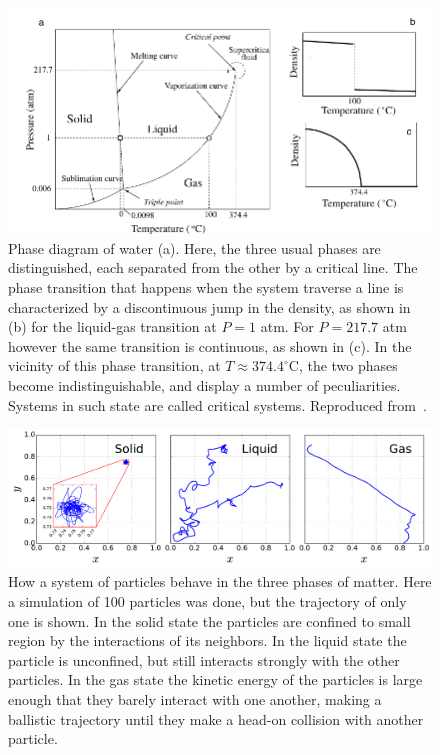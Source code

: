 \begin{figure}[h]
\begin{center}
    \includegraphics[scale=1.0]{chapters/ch2-crit/figs/water}
\end{center}
\caption{Phase diagram of water (a). Here, the three usual phases are
    distinguished, each separated from the other by a critical line. The phase
    transition that happens when the system traverse a line is characterized by
    a discontinuous jump in the density, as shown in (b) for the liquid-gas
    transition at $P=1$ atm. For $P=217.7$ atm however the same transition is
    continuous, as shown in (c). In the vicinity of this phase transition, at
    $T\approx374.4^\circ$C, the two phases become indistinguishable, and
    display a number of peculiarities. Systems in such state are called
    critical systems. Reproduced from~\cite{Sole2011}.}
\label{fig:water}
\end{figure}


\begin{figure}[h]
\begin{center}
    \includegraphics[scale=0.4]{chapters/ch2-crit/figs/phases}
\end{center}
\caption{How a system of particles behave in the three phases of matter. Here a
    simulation of 100 particles was done, but the trajectory of only one is
    shown. In the solid state the particles are confined to small region by
    the interactions of its neighbors. In the liquid state the particle is
    unconfined, but still interacts strongly with the other particles. In the
    gas state the kinetic energy of the particles is large enough that they
    barely interact with one another, making a ballistic trajectory until
    they make a head-on collision with another particle.}
\label{fig:phases}
\end{figure}


